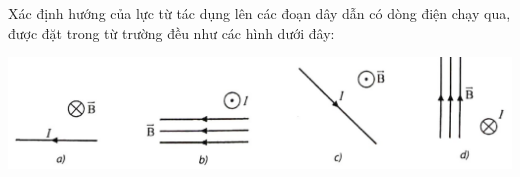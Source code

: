 \begin{ex}
	Xác định hướng của lực từ tác dụng lên các đoạn dây dẫn có dòng điện chạy qua, được đặt trong từ trường đều như các hình dưới đây:
	\begin{center}
		\includegraphics[width=0.8\linewidth]{../figs/VN12-Y24-PH-SYL-018P-3}
	\end{center}
\end{ex}
